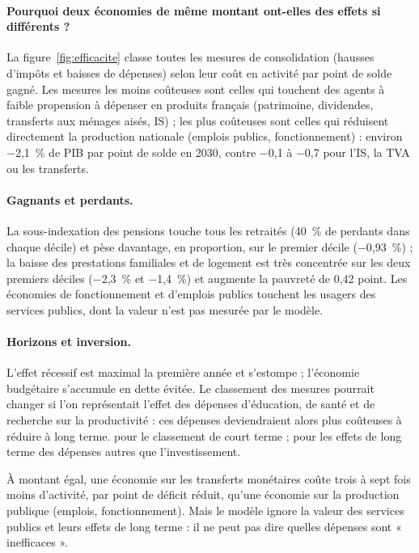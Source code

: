\paragraph{Pourquoi deux économies de même montant ont-elles des effets si différents ?} La
figure~\ref{fig:efficacite} classe toutes les mesures de consolidation (hausses d'impôts et baisses de dépenses) selon
leur coût en activité par point de solde gagné. Les mesures les moins coûteuses sont celles qui touchent des agents à
faible propension à dépenser en produits français (patrimoine, dividendes, transferts aux ménages aisés, IS) ; les plus
coûteuses sont celles qui réduisent directement la production nationale (emplois publics, fonctionnement) : environ
$-$2,1~\% de PIB par point de solde en 2030, contre $-$0,1 à $-$0,7 pour l'IS, la TVA ou les transferts.

\paragraph{Gagnants et perdants.} La sous-indexation des pensions touche tous les retraités (40~\% de perdants dans
chaque décile) et pèse davantage, en proportion, sur le premier décile ($-$0,93~\%) ; la baisse des prestations
familiales et de logement est très concentrée sur les deux premiers déciles ($-$2,3~\% et $-$1,4~\%) et augmente la
pauvreté de 0,42 point. Les économies de fonctionnement et d'emplois publics touchent les usagers des services publics,
dont la valeur n'est pas mesurée par le modèle.

\paragraph{Horizons et inversion.} L'effet récessif est maximal la première année et s'estompe ; l'économie budgétaire
s'accumule en dette évitée. Le classement des mesures pourrait changer si l'on représentait l'effet des dépenses
d'éducation, de santé et de recherche sur la productivité : ces dépenses deviendraient alors plus coûteuses à réduire à
long terme.  pour le classement de court terme ;  pour les effets de long terme des
dépenses autres que l'investissement.

\begin{resultat}
À montant égal, une économie sur les transferts monétaires coûte trois à sept fois moins d'activité, par point de
déficit réduit, qu'une économie sur la production publique (emplois, fonctionnement). Mais le modèle ignore la valeur
des services publics et leurs effets de long terme : il ne peut pas dire quelles dépenses sont « inefficaces ».
\end{resultat}

